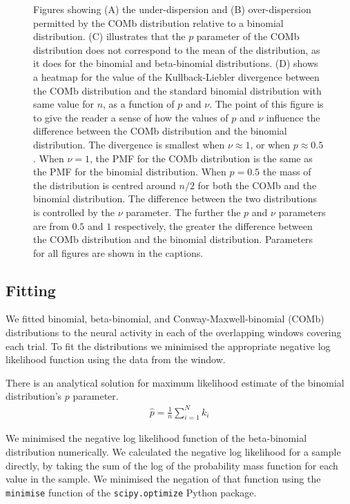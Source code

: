 \begin{figure}[p]
        \caption{Figures showing (A) the under-dispersion and (B) over-dispersion permitted by the COMb distribution relative to a binomial distribution. (C) illustrates that the $p$ parameter of the COMb distribution does not correspond to the mean of the distribution, as it does for the binomial and beta-binomial distributions. (D) shows a heatmap for the value of the Kullback-Liebler divergence between the COMb distribution and the standard binomial distribution with same value for $n$, as a function of $p$ and $\nu$. The point of this figure is to give the reader a sense of how the values of $p$ and $\nu$ influence the difference between the COMb distribution and the binomial distribution. The divergence is smallest when $\nu \approx 1$, or when $p \approx 0.5$. When $\nu = 1$, the PMF for the COMb distribution is the same as the PMF for the binomial distribution. When $p = 0.5$ the mass of the distribution is centred around $n/2$ for both the COMb and the binomial distribution. The difference between the two distributions is controlled by the $\nu$ parameter. The further the $p$ and $\nu$ parameters are from $0.5$ and $1$ respectively, the greater the difference between the COMb distribution and the binomial distribution. Parameters for all figures are shown in the captions.}
      \end{figure}

    \subsection{Fitting}
    We fitted binomial, beta-binomial, and Conway-Maxwell-binomial (COMb) distributions to the neural activity in each of the overlapping windows covering each trial. To fit the distributions we minimised the appropriate negative log likelihood function using the data from the window.

    There is an analytical solution for maximum likelihood estimate of the binomial distribution's $p$ parameter.
    \begin{align}\label{eq:binomial_log_like_p_estimate}
      \hat{p} = \frac{1}{n}\sum_{i=1}^N k_i
    \end{align}

    We minimised the negative log likelihood function of the beta-binomial distribution numerically. We calculated the negative log likelihood for a sample directly, by taking the sum of the log of the probability mass function for each value in the sample. We minimised the negation of that function using the \texttt{minimise} function of the \texttt{scipy.optimize} Python package.

